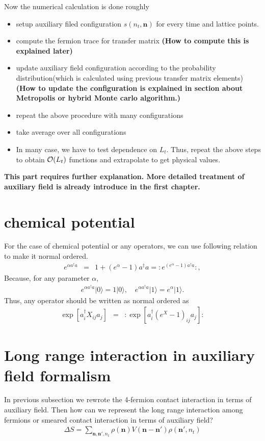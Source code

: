 \documentclass[10pt]{book}
\def\bm{\boldsymbol}
\newcommand{\bea}{\begin{eqnarray}}
\newcommand{\eea}{\end{eqnarray}}
\def\vn{{\bm n}}
\def\ra{\rangle}
\begin{document}
Now the numerical calculation is done roughly
\begin{itemize}
	\item setup auxiliary filed configuration $s(n_t,{\bm n})$ for every time and lattice points.
	\item compute the fermion trace for transfer matrix {\bf (How to compute this is explained later)   }
	\item update auxiliary field configuration according to the 
	      probability distribution(which is calculated using previous 
	      transfer matrix elements) {\bf (How to update the configuration is explained in 
	      section about Metropolis or hybrid Monte carlo algorithm.)}
	\item repeat the above procedure with many configurations 
	\item take average over all configurations
	\item In many case, we have to test dependence on $L_t$. Thus, repeat the above steps 
	      to obtain ${\cal O}(L_t)$ functions and extrapolate to get physical values.       
\end{itemize}

{\color{red} {\bf This part requires further explanation. More detailed 
treatment of auxiliary field is already introduce in the first chapter.} }

\section{chemical potential}

For the case of chemical potential or any operators,
we can use following relation to make it normal ordered.
\bea 
e^{\alpha a^\dagger a}&= & 1+(e^{\alpha}-1)a^\dagger a=: e^{(e^\alpha-1)a^\dagger a}:,
\eea 
Because, for any parameter $\alpha$, 
\bea 
e^{\alpha a^\dagger a}|0\ra =1|0\ra,\quad e^{\alpha a^\dagger a}|1\ra =e^{\alpha}|1\ra.
\eea 
Thus, any operator should be written as normal ordered as
\bea 
\exp[a_i^\dagger X_{ij} a_j]&=& :\exp[a_i^\dagger(e^X -1)_{ij} a_j]: 
\eea 

\section{Long range interaction in auxiliary field formalism}
In previous subsection we rewrote the 4-fermion contact interaction 
in terms of auxiliary field. Then how can we represent the long range interaction
among fermions or smeared contact interaction in terms of auxiliary field?
\bea 
\Delta S=\sum_{\vn,\vn', n_t}\rho(\vn)V(\vn-\vn')\rho(\vn',n_t)
\eea 
\end{document}
